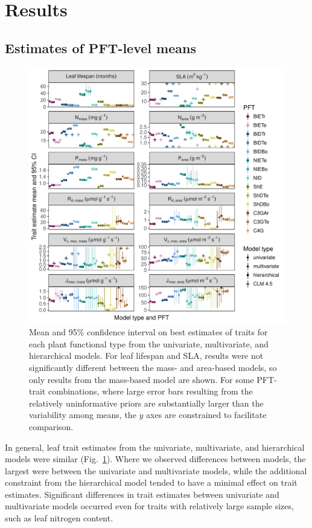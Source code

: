 \section{Results}\label{sec:mvtraits-results}

\subsection{Estimates of PFT-level means}

\begin{figure}
  \centering
  \includegraphics[width=\textwidth]{1_mvtraits/figures/mean_comparison.pdf}
  \caption{%
    Mean and 95\% confidence interval on best estimates of traits for each plant functional type from the univariate, multivariate, and hierarchical models.
    For leaf lifespan and SLA, results were not significantly different between the mass- and area-based models, so only results from the mass-based model are shown.
    For some PFT-trait combinations, where large error bars resulting from the relatively uninformative priors are substantially larger than the variability among means, the $y$ axes are constrained to facilitate comparison.
  }\label{fig:mvtraits-fig2}
\end{figure}

In general, leaf trait estimates from the univariate, multivariate, and hierarchical models were similar (Fig.~\ref{fig:mvtraits-fig2}).
Where we observed differences between models, the largest were between the univariate and multivariate models, while the additional constraint from the hierarchical model tended to have a minimal effect on trait estimates.
Significant differences in trait estimates between univariate and multivariate models occurred even for traits with relatively large sample sizes, such as leaf nitrogen content.

